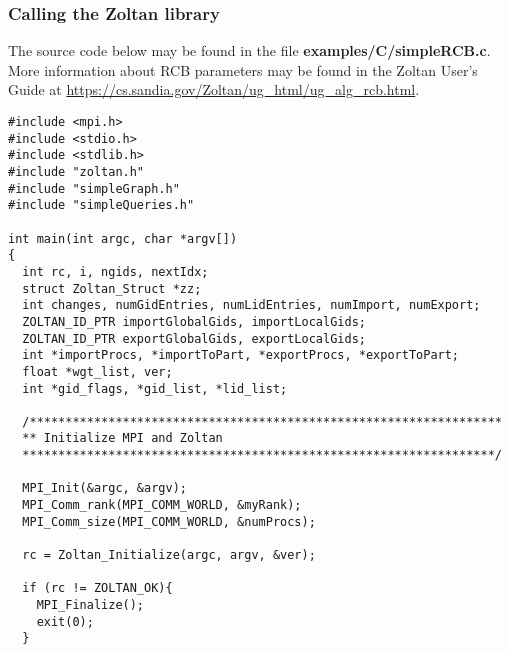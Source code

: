 \clearpage
\subsubsection{Calling the Zoltan library}

The source code below may be found in the file
\textbf{examples/C/simpleRCB.c}.
More information about RCB parameters
may be found in the Zoltan User's Guide at
\url{https://cs.sandia.gov/Zoltan/ug_html/ug_alg_rcb.html}.

\begin{flushleft}
\begin{verbatim}
#include <mpi.h>
#include <stdio.h>
#include <stdlib.h>
#include "zoltan.h"
#include "simpleGraph.h"
#include "simpleQueries.h"

int main(int argc, char *argv[])
{
  int rc, i, ngids, nextIdx;
  struct Zoltan_Struct *zz;
  int changes, numGidEntries, numLidEntries, numImport, numExport;
  ZOLTAN_ID_PTR importGlobalGids, importLocalGids;
  ZOLTAN_ID_PTR exportGlobalGids, exportLocalGids; 
  int *importProcs, *importToPart, *exportProcs, *exportToPart;
  float *wgt_list, ver;
  int *gid_flags, *gid_list, *lid_list;

  /******************************************************************
  ** Initialize MPI and Zoltan
  ******************************************************************/

  MPI_Init(&argc, &argv);
  MPI_Comm_rank(MPI_COMM_WORLD, &myRank);
  MPI_Comm_size(MPI_COMM_WORLD, &numProcs);

  rc = Zoltan_Initialize(argc, argv, &ver);

  if (rc != ZOLTAN_OK){
    MPI_Finalize();
    exit(0);
  }
\end{verbatim}
\end{flushleft}

